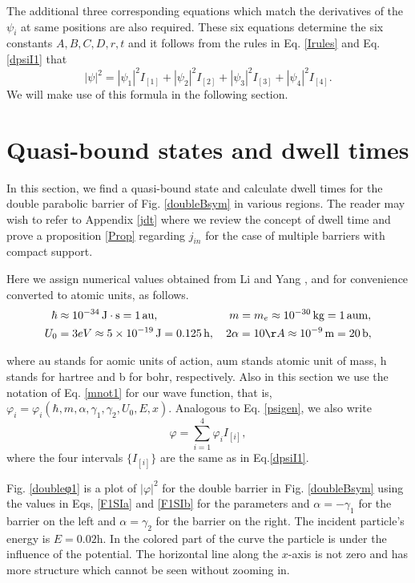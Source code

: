 \documentclass{article}
\numberwithin{equation}{section}
\begin{document}
The additional three corresponding equations which match the derivatives of the $\psi_i$ at same positions are also required.  These six equations determine the six constants $A, B, C, D, r, t$ and it follows from the rules in Eq. \eqref{Irules} and Eq. \eqref{dpsiI1} that
\begin{equation}
|\psi|^2=|\psi_{1}|^2I_{\left[1\right]}+|\psi_{2}|^2I_{\left[2\right]}+|\psi_{3}|^2I_{\left[3\right]}+|\psi_{4}|^2I_{\left[4\right]}.\label{dpsi2}
\end{equation}
We will make use of this formula in the following section.

\section{Quasi-bound states and dwell times}\label{qbdw}

In this section, we find a quasi-bound state and calculate dwell times for the double parabolic barrier of Fig. \ref{doubleBsym} in various regions. The reader may wish to refer to Appendix \ref{jdt} where we review the concept of dwell time and prove a proposition \ref{Prop} regarding $j_{in}$ for the case of multiple barriers with compact support.

Here we assign numerical values obtained from Li and Yang \cite{LY24}, and for convenience converted to atomic units, as follows.  
\begin{align}
\hbar&\approx 10^{-34}\,\textup{J}\cdot \textup{s}=1\,\textup{au},\qquad\qquad\qquad\; m=m_e\approx 10^{-30}\,\textup{kg}=1\,\textup{aum},\label{F1SIa}\\
U_0&=3eV\approx 5\times 10^{-19}\,\textup{J}=0.125\,\textup{h}, \quad 2\alpha=10\AA\approx 10^{-9}\,\textup{m}=20\,\textup{b},\label{F1SIb}
\end{align}

where au stands for aomic units of action, aum stands atomic unit of mass, h stands for hartree and b for bohr, respectively.  Also in this section we use the notation of Eq. \eqref{mnot1} for our wave function, that is, $\varphi_i=\varphi_i(\hbar,m,\alpha,\gamma_1,\gamma_2,U_0,E,x)$. Analogous to Eq. \eqref{psigen}, we also write
\begin{equation}
\varphi=\sum_{i=1}^{4}\varphi_{i}I_{\left[i\right]},\label{psigen2}
\end{equation}
where the four intervals $\{I_{\left[i\right]}\}$ are the same as in Eq.\eqref{dpsiI1}.

Fig. \ref{doubleφ1} is a plot of $|\varphi|^2$ for the double barrier in Fig. \ref{doubleBsym} using the values in Eqs, \eqref{F1SIa} and \eqref{F1SIb} for the parameters and $\alpha=-\gamma_1$ for the barrier on the left and $\alpha=\gamma_2$ for the barrier on the right. The incident particle's energy is $E=0.02$h.  In the colored part of the curve the particle is under the influence of the potential.  The horizontal line along the $x$-axis is not zero and has more structure which cannot be seen without zooming in.
\end{document}
